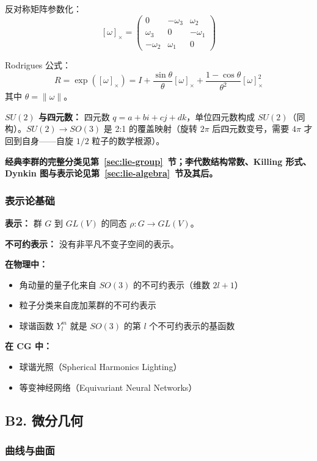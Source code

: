 反对称矩阵参数化：
\[
[\omega]_\times = \begin{pmatrix} 0 & -\omega_3 & \omega_2 \\ \omega_3 & 0 & -\omega_1 \\ -\omega_2 & \omega_1 & 0 \end{pmatrix}
\]

Rodrigues 公式：
\[
R = \exp([\omega]_\times) = I + \frac{\sin\theta}{\theta}[\omega]_\times + \frac{1-\cos\theta}{\theta^2}[\omega]_\times^2
\]
其中 $\theta = \|\omega\|$。

\textbf{$SU(2)$ 与四元数：} 四元数 $q = a + bi + cj + dk$，单位四元数构成 $SU(2)$（同构）。$SU(2) \to SO(3)$ 是 2:1 的覆盖映射（旋转 $2\pi$ 后四元数变号，需要 $4\pi$ 才回到自身——自旋 $1/2$ 粒子的数学根源）。

\textbf{经典李群的完整分类见第~\ref{sec:lie-group}~节；李代数结构常数、Killing 形式、Dynkin 图与表示论见第~\ref{sec:lie-algebra}~节及其后。}

\subsubsection{表示论基础}

\textbf{表示：} 群 $G$ 到 $GL(V)$ 的同态 $\rho: G \to GL(V)$。

\textbf{不可约表示：} 没有非平凡不变子空间的表示。

\textbf{在物理中：}
\begin{itemize}
  \item 角动量的量子化来自 $SO(3)$ 的不可约表示（维数 $2l+1$）
  \item 粒子分类来自庞加莱群的不可约表示
  \item 球谐函数 $Y_l^m$ 就是 $SO(3)$ 的第 $l$ 个不可约表示的基函数
\end{itemize}

\textbf{在 CG 中：}
\begin{itemize}
  \item 球谐光照（Spherical Harmonics Lighting）
  \item 等变神经网络（Equivariant Neural Networks）
\end{itemize}

\subsection{B2. 微分几何}

\subsubsection{曲线与曲面}

